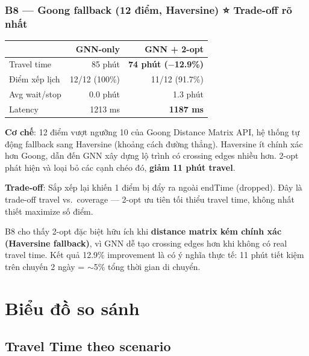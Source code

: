 \documentclass[12pt,a4paper]{article}
\begin{document}
\subsubsection*{B8 --- Goong fallback (12 điểm, Haversine) ⭐ Trade-off rõ nhất}

\begin{tcolorbox}[resultbox, title={B8 --- GNN + 2-opt giảm 12.9\% travel time}]
\begin{tabular}{lrr}
\toprule
& \textbf{GNN-only} & \textbf{GNN + 2-opt} \\
\midrule
Travel time      & 85 phút        & \textbf{74 phút ($-$12.9\%)} \\
Điểm xếp lịch   & 12/12 (100\%)  & 11/12 (91.7\%) \\
Avg wait/stop    & 0.0 phút       & 1.3 phút \\
Latency          & 1213 ms        & \textbf{1187 ms} \\
\bottomrule
\end{tabular}
\end{tcolorbox}

\textbf{Cơ chế}: 12 điểm vượt ngưỡng 10 của Goong Distance Matrix API, hệ thống tự động
fallback sang Haversine (khoảng cách đường thẳng). Haversine ít chính xác hơn Goong,
dẫn đến GNN xây dựng lộ trình có crossing edges nhiều hơn.
2-opt phát hiện và loại bỏ các cạnh chéo đó, \textbf{giảm 11 phút travel}.

\textbf{Trade-off}: Sắp xếp lại khiến 1 điểm bị đẩy ra ngoài endTime (dropped).
Đây là trade-off travel vs.\ coverage --- 2-opt ưu tiên tối thiểu travel time,
không nhất thiết maximize số điểm.

\begin{tcolorbox}[warnbox, title={Nhận định cho báo cáo}]
B8 cho thấy 2-opt đặc biệt hữu ích khi \textbf{distance matrix kém chính xác (Haversine fallback)},
vì GNN dễ tạo crossing edges hơn khi không có real travel time. Kết quả 12.9\% improvement là
có ý nghĩa thực tế: 11 phút tiết kiệm trên chuyến 2 ngày = $\sim$5\% tổng thời gian di chuyển.
\end{tcolorbox}

\section{Biểu đồ so sánh}

\subsection{Travel Time theo scenario}
\end{document}
